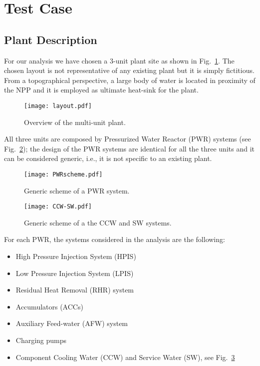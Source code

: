 \section{Test Case}
\label{sec:testCase}

\subsection{Plant Description}
For our analysis we have chosen a 3-unit plant site as shown in Fig.~\ref{fig:layout}. The chosen layout 
is not representative of any existing plant but it is simply fictitious.
From a topographical perspective, a large body of water is located in proximity of the NPP and it is 
employed as ultimate heat-sink for the plant.

\begin{figure}
    \centering
    \texttt{[image: layout.pdf]}
    \caption{Overview of the multi-unit plant.}
    \label{fig:layout}
\end{figure}

All three units are composed by Pressurized Water Reactor (PWR) systems (see Fig.~\ref{fig:PWRscheme}); 
the design of the PWR systems are identical for all the three units and it 
can be considered generic, i.e., it is not specific to an existing plant. 

\begin{figure}
    \centering
    \texttt{[image: PWRscheme.pdf]}
    \caption{Generic scheme of a PWR system.}
    \label{fig:PWRscheme}
\end{figure}

\begin{figure}
    \centering
    \texttt{[image: CCW-SW.pdf]}
    \caption{Generic scheme of a the CCW and SW systems.}
    \label{fig:CCW-SWscheme}
\end{figure}

For each PWR, the systems considered in the analysis are the following:
\begin{itemize}
  \item High Pressure Injection System (HPIS)
  \item Low Pressure Injection System (LPIS)
  \item Residual Heat Removal (RHR) system
  \item Accumulators (ACCs)
  \item Auxiliary Feed-water (AFW) system 
  \item Charging pumps
  \item Component Cooling Water (CCW) and Service Water (SW), see Fig.~\ref{fig:CCW-SWscheme}
\end{itemize}

